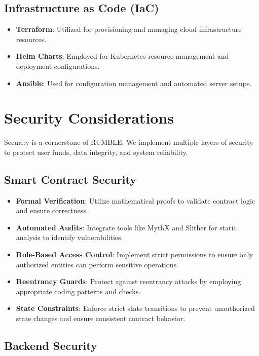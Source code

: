 \documentclass[11pt,a4paper]{article}
\begin{document}
\subsection{Infrastructure as Code (IaC)}

\begin{itemize}
    \item \textbf{Terraform}: Utilized for provisioning and managing cloud infrastructure resources.
    \item \textbf{Helm Charts}: Employed for Kubernetes resource management and deployment configurations.
    \item \textbf{Ansible}: Used for configuration management and automated server setups.
\end{itemize}

\section{Security Considerations}

Security is a cornerstone of RUMBLE. We implement multiple layers of security to protect user funds, data integrity, and system reliability.

\subsection{Smart Contract Security}

\begin{itemize}
    \item \textbf{Formal Verification}: Utilize mathematical proofs to validate contract logic and ensure correctness.
    \item \textbf{Automated Audits}: Integrate tools like MythX and Slither for static analysis to identify vulnerabilities.
    \item \textbf{Role-Based Access Control}: Implement strict permissions to ensure only authorized entities can perform sensitive operations.
    \item \textbf{Reentrancy Guards}: Protect against reentrancy attacks by employing appropriate coding patterns and checks.
    \item \textbf{State Constraints}: Enforce strict state transitions to prevent unauthorized state changes and ensure consistent contract behavior.
\end{itemize}

\subsection{Backend Security}
\end{document}
